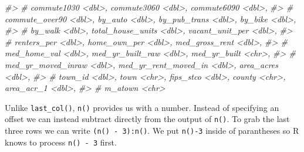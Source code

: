 \documentclass[
]{book}
\newenvironment{Shaded}{\begin{snugshade}}{\end{snugshade}}
\newcommand{\CommentTok}[1]{\textcolor[rgb]{0.56,0.35,0.01}{\textit{#1}}}
\begin{document}
\begin{Shaded}
\begin{Highlighting}[]
\CommentTok{\#\textgreater{} \#   commute1030 \textless{}dbl\textgreater{}, commute3060 \textless{}dbl\textgreater{}, commute6090 \textless{}dbl\textgreater{},}
\CommentTok{\#\textgreater{} \#   commute\_over90 \textless{}dbl\textgreater{}, by\_auto \textless{}dbl\textgreater{}, by\_pub\_trans \textless{}dbl\textgreater{}, by\_bike \textless{}dbl\textgreater{},}
\CommentTok{\#\textgreater{} \#   by\_walk \textless{}dbl\textgreater{}, total\_house\_units \textless{}dbl\textgreater{}, vacant\_unit\_per \textless{}dbl\textgreater{},}
\CommentTok{\#\textgreater{} \#   renters\_per \textless{}dbl\textgreater{}, home\_own\_per \textless{}dbl\textgreater{}, med\_gross\_rent \textless{}dbl\textgreater{},}
\CommentTok{\#\textgreater{} \#   med\_home\_val \textless{}dbl\textgreater{}, med\_yr\_built\_raw \textless{}dbl\textgreater{}, med\_yr\_built \textless{}chr\textgreater{},}
\CommentTok{\#\textgreater{} \#   med\_yr\_moved\_inraw \textless{}dbl\textgreater{}, med\_yr\_rent\_moved\_in \textless{}dbl\textgreater{}, area\_acres \textless{}dbl\textgreater{},}
\CommentTok{\#\textgreater{} \#   town\_id \textless{}dbl\textgreater{}, town \textless{}chr\textgreater{}, fips\_stco \textless{}dbl\textgreater{}, county \textless{}chr\textgreater{}, area\_acr\_1 \textless{}dbl\textgreater{},}
\CommentTok{\#\textgreater{} \#   m\_atown \textless{}chr\textgreater{}}
\end{Highlighting}
\end{Shaded}

Unlike \texttt{last\_col()}, \texttt{n()} provides us with a number. Instead of specifying an offset we can instead subtract directly from the output of \texttt{n()}. To grab the last three rows we can write \texttt{(n()\ -\ 3):n()}. We put \texttt{n()-3} inside of parantheses so R knows to process \texttt{n()\ -\ 3} first.
\end{document}
